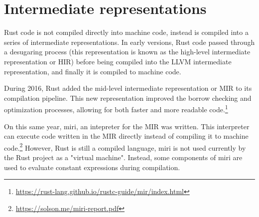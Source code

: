 \section{Intermediate representations}

Rust code is not compiled directly into machine code, instead is compiled into
a series of intermediate representations. In early versions, Rust code passed
through a desugaring process (this representation is known as the high-level
intermediate representation or HIR) before being compiled into the LLVM
intermediate representation, and finally it is compiled to machine
code.

During 2016, Rust added the mid-level intermediate representation or MIR to its
compilation pipeline. This new representation improved the borrow checking
and optimization processes, allowing for both faster and more readable
code.\footnote{\url{https://rust-lang.github.io/rustc-guide/mir/index.html}}

On this same year, miri, an intepreter for the MIR was written. This interpreter
can execute code written in the MIR directly instead of compiling it to machine
code.\footnote{\url{https://solson.me/miri-report.pdf}} However, Rust is still
a compiled language, miri is not used currently by the Rust project as a
"virtual machine". Instead, some components of miri are used to evaluate
constant expressions during compilation.

